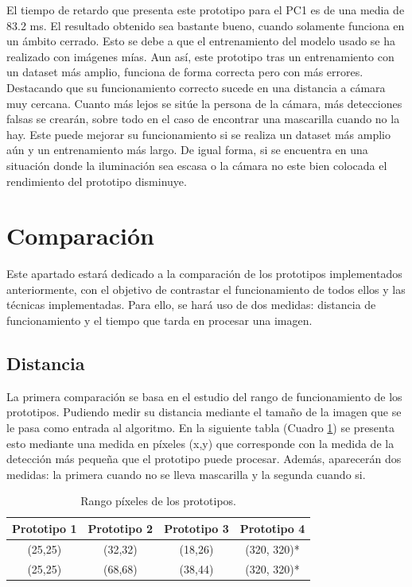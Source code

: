 El tiempo de retardo que presenta este prototipo para el PC1 es de una media de 83.2 ms. El resultado obtenido sea bastante bueno, cuando solamente funciona en un ámbito cerrado. Esto se debe a que el entrenamiento del modelo usado se ha realizado con imágenes mías. Aun así, este prototipo tras un entrenamiento con un dataset más amplio, funciona de forma correcta pero con más errores. Destacando que su funcionamiento correcto sucede en una distancia a cámara muy cercana. Cuanto más lejos se sitúe la persona de la cámara, más detecciones falsas se crearán, sobre todo en el caso de encontrar una mascarilla cuando no la hay. Este puede mejorar su funcionamiento si se realiza un dataset más amplio aún y un entrenamiento más largo. De igual forma, si se encuentra en una situación donde la iluminación sea escasa o la cámara no este bien colocada el rendimiento del prototipo disminuye.

\newpage
\section{Comparación}

Este apartado estará dedicado a la comparación de los prototipos implementados anteriormente, con el objetivo de contrastar el funcionamiento de todos ellos y las técnicas implementadas. Para ello, se hará uso de dos medidas: distancia de funcionamiento y el tiempo que tarda en procesar una imagen.

\subsection*{Distancia}
\vspace{-0.5cm}
La primera comparación se basa en el estudio del rango de funcionamiento de los prototipos. Pudiendo medir su distancia mediante el tamaño de la imagen que se le pasa como entrada al algoritmo. En la siguiente tabla (Cuadro \ref{tab:table3}) se presenta esto mediante una medida en píxeles (x,y) que corresponde con la medida de la detección más pequeña que el prototipo puede procesar. Además, aparecerán dos medidas: la primera cuando no se lleva mascarilla y la segunda cuando si.

\begin{table}[h!]
	\begin{center}
		\begin{tabular}{ |c|c|c|c| } 
			\hline
			\textbf{Prototipo 1} & \textbf{Prototipo 2} & \textbf{Prototipo 3} & \textbf{Prototipo 4} \\
			\hline
			(25,25) & (32,32)  & (18,26) & (320, 320)* \\
			(25,25) & (68,68)  & (38,44) & (320, 320)* \\
			\hline
		\end{tabular}
		\caption{Rango píxeles de los prototipos.}
		\label{tab:table3}
	\end{center}
\end{table}

